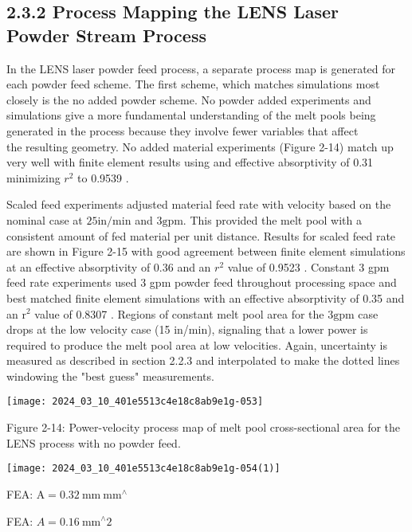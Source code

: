\documentclass[10pt]{article}
\begin{document}
\subsection*{2.3.2 Process Mapping the LENS Laser Powder Stream Process}
In the LENS laser powder feed process, a separate process map is generated for each powder feed scheme. The first scheme, which matches simulations most closely is the no added powder scheme. No powder added experiments and simulations give a more fundamental understanding of the melt pools being generated in the process because they involve fewer variables that affect\\
the resulting geometry. No added material experiments (Figure 2-14) match up very well with finite element results using and effective absorptivity of 0.31 minimizing $r^{2}$ to 0.9539 .

Scaled feed experiments adjusted material feed rate with velocity based on the nominal case at $25 \mathrm{in} / \mathrm{min}$ and $3 \mathrm{gpm}$. This provided the melt pool with a consistent amount of fed material per unit distance. Results for scaled feed rate are shown in Figure 2-15 with good agreement between finite element simulations at an effective absorptivity of 0.36 and an $r^{2}$ value of 0.9523 . Constant 3 gpm feed rate experiments used 3 gpm powder feed throughout processing space and best matched finite element simulations with an effective absorptivity of 0.35 and an $\mathrm{r}^{2}$ value of 0.8307 . Regions of constant melt pool area for the $3 \mathrm{gpm}$ case drops at the low velocity case (15 in/min), signaling that a lower power is required to produce the melt pool area at low velocities. Again, uncertainty is measured as described in section 2.2.3 and interpolated to make the dotted lines windowing the "best guess" measurements.

\begin{center}
\texttt{[image: 2024\_03\_10\_401e5513c4e18c8ab9e1g-053]}
\end{center}

Figure 2-14: Power-velocity process map of melt pool cross-sectional area for the LENS process with no powder feed.

\begin{center}
\texttt{[image: 2024\_03\_10\_401e5513c4e18c8ab9e1g-054(1)]}
\end{center}

FEA: $\mathrm{A}=0.32 \mathrm{~mm} \mathrm{~mm}^{\wedge}$

FEA: $A=0.16 \mathrm{~mm}^{\wedge} 2$
\end{document}
